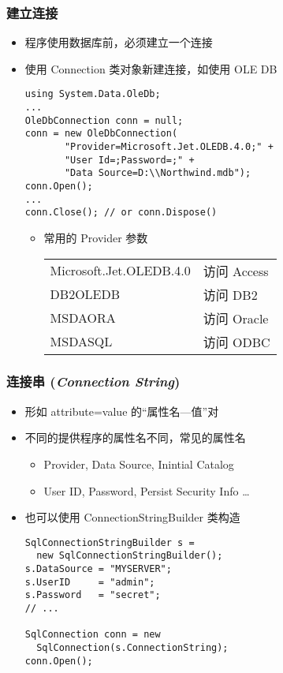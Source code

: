\begin{frame}[fragile]
\frametitle{建立连接}
\begin{itemize}
\item 程序使用数据库前，必须建立一个连接
\item 使用 Connection 类对象新建连接，如使用 OLE DB
\begin{lstlisting}
using System.Data.OleDb;
...
OleDbConnection conn = null;
conn = new OleDbConnection(
       "Provider=Microsoft.Jet.OLEDB.4.0;" +
       "User Id=;Password=;" +
       "Data Source=D:\\Northwind.mdb");
conn.Open();
...
conn.Close(); // or conn.Dispose()
\end{lstlisting}

\begin{itemize}
\item 常用的 Provider 参数

\begin{tabular}{l|l}
\hline
  \small Microsoft.Jet.OLEDB.4.0 & 访问 Access \\
  DB2OLEDB & 访问 DB2 \\
  MSDAORA & 访问 Oracle \\
  MSDASQL & 访问 ODBC \\
\hline
\end{tabular}
\end{itemize}
\end{itemize}
\end{frame}

\begin{frame}[fragile]
\frametitle{连接串 (\textit{Connection String})}
\begin{itemize}
\item 形如 attribute=value 的``属性名---值''对
\item 不同的提供程序的属性名不同，常见的属性名
\begin{itemize}
\item Provider, Data Source, Inintial Catalog
\item User ID, Password, Persist Security Info \dots
\end{itemize}
\item 也可以使用 ConnectionStringBuilder 类构造
\begin{lstlisting}
SqlConnectionStringBuilder s = 
  new SqlConnectionStringBuilder();
s.DataSource = "MYSERVER";
s.UserID     = "admin";
s.Password   = "secret";
// ...

SqlConnection conn = new 
  SqlConnection(s.ConnectionString);
conn.Open();
\end{lstlisting}
\end{itemize}
\end{frame}

